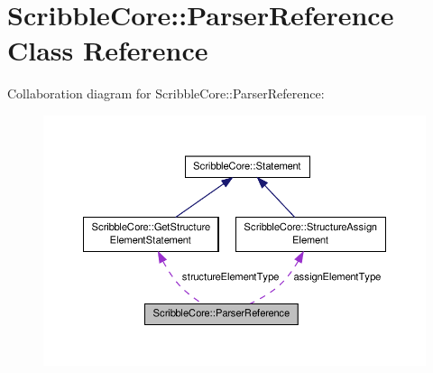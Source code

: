 \hypertarget{class_scribble_core_1_1_parser_reference}{\section{Scribble\-Core\-:\-:Parser\-Reference Class Reference}
\label{class_scribble_core_1_1_parser_reference}
}


Collaboration diagram for Scribble\-Core\-:\-:Parser\-Reference\-:
\nopagebreak
\begin{figure}[H]
\begin{center}
\leavevmode
\includegraphics[width=350pt]{class_scribble_core_1_1_parser_reference__coll__graph}
\end{center}
\end{figure}
